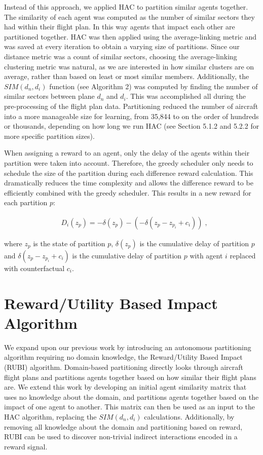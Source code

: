 \documentclass[onehalf,11pt]{beavtex}
\begin{document}
Instead of this approach, we applied HAC \cite{Agglomerative} to partition similar agents together. The similarity of each agent was computed as the number of similar sectors they had within their flight plan. In this way agents that impact each other are partitioned together. HAC was then applied using the average-linking metric and was saved at every iteration to obtain a varying size of partitions. Since our distance metric was a count of similar sectors, choosing the average-linking clustering metric was natural, as we are interested in how similar clusters are on average, rather than based on least or most similar members.  Additionally, the $SIM(d_n, d_i)$ function (see Algorithm 2) was computed by finding the number of similar sectors between plane $d_n$ and $d_i$. This was accomplished all during the pre-processing of the flight plan data. Partitioning reduced the number of aircraft into a more manageable size for learning, from 35,844 to on the order of hundreds or thousands, depending on how long we run HAC (see Section 5.1.2 and 5.2.2 for more specific partition sizes). 

When assigning a reward to an agent, only the delay of the agents within their partition were taken into account. Therefore, the greedy scheduler only needs to schedule the size of the partition during each difference reward calculation. This dramatically reduces the time complexity and allows the difference reward to be efficiently combined with the greedy scheduler. This results in a new reward for each partition $p$:

\begin{equation}
\begin{split}
&D_i(z_p) = -\delta(z_p) - (-\delta(z_p-z_{{p}_i} + c_i))\;,
\end{split}
\end{equation}

where $z_p$ is the state of partition $p$, \textit{$\delta(z_p)$} is the cumulative delay of partition $p$ and \textit{$\delta(z_p-z_{{p}_i} + c_i)$} is the cumulative delay of partition $p$ with agent $i$ replaced with counterfactual \textit{$c_i$}.

\section{Reward/Utility Based Impact Algorithm}

We expand upon our previous work by introducing an autonomous partitioning algorithm requiring no domain knowledge, the Reward/Utility Based Impact (RUBI) algorithm. Domain-based partitioning directly looks through aircraft flight plans and partitions agents together based on how similar their flight plans are. We extend this work by developing an initial agent similarity matrix that uses no knowledge about the domain, and partitions agents together based on the impact of one agent to another. This matrix can then be used as an input to the HAC algorithm, replacing the $SIM(d_n, d_i)$ calculations. Additionally, by removing all knowledge about the domain and partitioning based on reward, RUBI can be used to discover non-trivial indirect interactions encoded in a reward signal.
\end{document}
